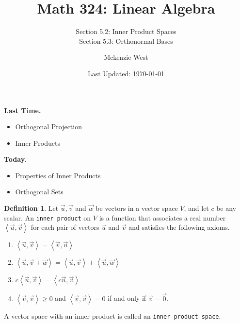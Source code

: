 \documentclass{beamer}
\newcommand{\vecu}{\vec{u}}
\newcommand{\fn}{\insertframenumber}
\newcommand{\ip}[2]{\left\langle #1,#2\right\rangle}
\theoremstyle{definition}
\newtheorem*{defn}{Definition}
\renewcommand{\emph}[1]{{\color{blue}\texttt{#1}}}
\begin{document}
	\title{Math 324: Linear Algebra}
	\subtitle{Section 5.2: Inner Product Spaces\\Section 5.3: Orthonormal Bases}
	\author{Mckenzie West}
	\date{Last Updated: \today}
\begin{frame}
\maketitle
\end{frame}

\begin{frame}{\insertframenumber}
	\begin{block}{\textbf{Last Time.}}
	\begin{itemize}[label=--]
		\item Orthogonal Projection
		\item Inner Products
	\end{itemize}
	\end{block}
	\begin{block}{\textbf{Today.}}
		\begin{itemize}[label=--]
			\item Properties of Inner Products
			\item Orthogonal Sets
		\end{itemize}
	\end{block}
\end{frame}
\begin{frame}{\fn}
	\begin{defn}
		Let $\vec u,\vec v$ and $\vec w$ be vectors in a vector space $V$, and let $c$ be any scalar.  An \emph{inner product} on $V$ is a function that associates a real number $\ip{\vecu}{\vec v}$ for each pair of vectors $\vec u$ and $\vec v$ and satisfies the following axioms.
		\begin{enumerate}[label=\textbf{\arabic*.}]
			\item $\ip{\vec u}{\vec v}=\ip{\vec v}{\vec u}$
			\item $\ip{\vec u}{\vec v+\vec w}=\ip{\vec u}{\vec v}+\ip{\vec u}{\vec w}$
			\item $c\ip{\vec u}{\vec v}=\ip{c\vec u}{\vec v}$
			\item $\ip{\vec v}{\vec v}\geq 0$ and $\ip{\vec v}{\vec v}=0$ if and only if $\vec v=\vec 0$.
		\end{enumerate}
	
		A vector space with an inner product is called an \emph{inner product space}.
	\end{defn}
\end{frame}
\end{document}
